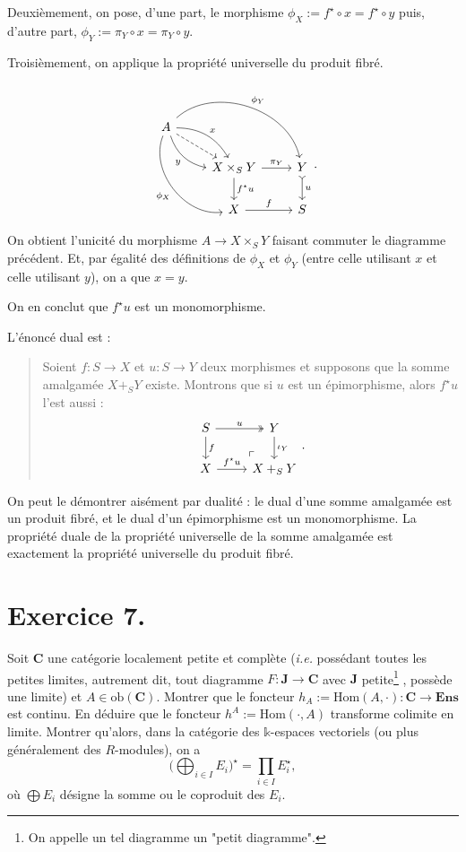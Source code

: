 \documentclass{../../td}
\makeatletter
\newcommand\showfootnote{%
  \tfn@tablefootnoteprintout%
  \gdef\tfn@fnt{0}%
}
\newcommand\pushout{\arrow[very near start,description,phantom]{ul}{\ulcorner}}
\makeatother
\begin{document}
  Deuxièmement, on pose, d'une part, le morphisme $\phi_X := f^\star \circ x = f^\star \circ y$ puis, d'autre part, $\phi_Y := \pi_Y \circ x = \pi_Y \circ y$.

  Troisièmement, on applique la propriété universelle du produit fibré.

  \[
  \begin{tikzcd}
    A \arrow[bend left]{dr}{x} \arrow[bend right,swap]{dr}{y} \arrow[bend right=60,swap]{ddr}{\phi_X} \arrow[bend left=60]{drr}{\phi_Y} \arrow[dashed]{dr}{}\\
    &X \times_S Y \arrow{r}{\pi_Y} \arrow{d}{f^\star u} & Y \arrow[tail]{d}{u}\\
    &X \arrow{r}{f} & S
  \end{tikzcd}
  .\] 

  On obtient l'unicité du morphisme $A \to X \times_S Y$ faisant commuter le diagramme précédent.
  Et, par égalité des définitions de $\phi_X$ et $\phi_Y$ (entre celle utilisant $x$ et celle utilisant $y$), on a que $x = y$.

  On en conclut que $f^\star u$ est un monomorphisme.

  L'énoncé dual est : 
  \begin{quote}
    Soient $f : S \to X$ et $u : S \to Y$ deux morphismes et supposons que la somme amalgamée $X +_S Y$ existe.
    Montrons que si  $u$ est un épimorphisme, alors $f^\star u$ l'est aussi :
    \[
    \begin{tikzcd}
      S \arrow{d}{f} \arrow[two heads]{r}{u} & Y \arrow{d}{\iota_Y}\\
      X \arrow{r}{f^\star u} & X +_S Y\pushout
    \end{tikzcd}
    .\]
  \end{quote}
  On peut le démontrer aisément par dualité : le dual d'une somme amalgamée est un produit fibré, et le dual d'un épimorphisme est un monomorphisme.
  La propriété duale de la propriété universelle de la somme amalgamée est exactement la propriété universelle du produit fibré.

  \chapter{Exercice 7.}

  \begin{slshape}
    \color{deepblue}
    Soit $\mathbf{C}$ une catégorie localement petite et complète (\textit{i.e.} possédant toutes les petites limites, autrement dit, tout diagramme $F : \mathbf{J} \to  \mathbf{C}$ avec $\mathbf{J}$ petite\footnote{On appelle un tel diagramme un "petit diagramme".}\showfootnote, possède une limite) et $A \in \mathrm{ob}(\mathbf{C})$.
    Montrer que le foncteur $h_A := \mathrm{Hom}(A, \cdot) : \mathbf{C} \to \mathbf{Ens}$ est continu.
    En déduire que le foncteur $h^A := \mathrm{Hom}(\cdot, A)$ transforme colimite en limite.
    Montrer qu'alors, dans la catégorie des $\mathds{k}$-espaces vectoriels (ou plus généralement des $R$-modules), on a \[
    \Big( \bigoplus_{i \in I} E_i\Big)^\star = \prod_{i \in I} E_i^\star
    ,\] 
    où $\bigoplus E_i$ désigne la somme ou le coproduit des $E_i$.
  \end{slshape}
\end{document}
